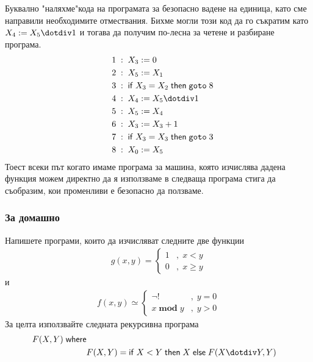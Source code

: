\documentclass[14pt]{extarticle}
\begin{document}
Буквално "наляхме"\;кода на програмата за безопасно вадене на единица, като сме направили необходимите отмествания.
Бихме могли този код да го съкратим като \(X_4 := X_5 \dotdiv 1\) и тогава да получим по-лесна за четене и разбиране програма.
\begin{align*}
    & \quad 1 \; : \; X_3 := 0 \\
    & \quad 2 \; : \; X_5 := X_1 \\
    & \quad 3 \; : \; \mathsf{if} \; X_3 = X_2 \; \mathsf{then} \; \mathtt{goto} \; 8 \\
    & \quad 4 \; : \; X_4 := X_5 \dotdiv 1 \\
    & \quad 5 \; : \; X_5 := X_4 \\
    & \quad 6 \; : \; X_3 := X_3 + 1 \\
    & \quad 7 \; : \; \mathsf{if} \; X_3 = X_3 \; \mathsf{then} \; \mathtt{goto} \; 3 \\
    & \quad 8 \; : \; X_0 := X_5
\end{align*}
Тоест всеки път когато имаме програма за машина, която изчислява дадена функция можем директно да я използваме в следваща програма стига да съобразим, кои променливи е безопасно да ползваме.
\newpage
\subsubsection*{За домашно}
Напишете програми, които да изчисляват следните две функции
\begin{align*}
    g(x, y) = \begin{cases}
    1 &, \; x < y \\
    0 &,\; x \geq y
    \end{cases}
\end{align*}
и
\begin{align*}
    f(x, y) \simeq \begin{cases}
    \lnot! &, \; y = 0 \\
    x \;\mathbf{mod}\; y &,\; y > 0
    \end{cases}
\end{align*}
За целта използвайте следната рекурсивна програма
\begin{align*}
    F(X,Y) \; \mathsf{where} \\
    & F(X, Y) =  \mathsf{if} \; X \;\mathbf{<}\; Y \; \mathsf{then} \; X  \; \mathsf{else} \; F(X \dotdiv Y, Y)
\end{align*}
\end{document}
